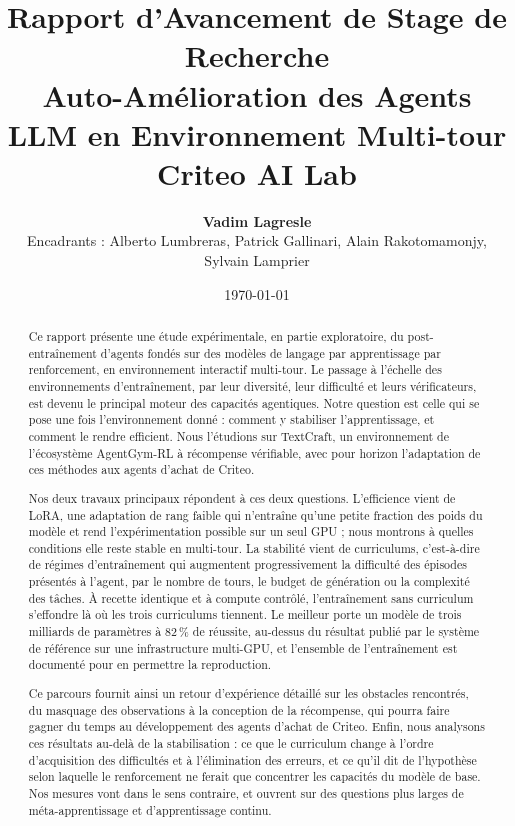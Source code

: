 \documentclass[11pt,a4paper]{article}
\title{\Large \textbf{Rapport d'Avancement de Stage de Recherche}\\ \huge \textbf{Auto-Amélioration des Agents LLM en Environnement Multi-tour}\\ \large Criteo AI Lab}
\author{\textbf{Vadim Lagresle} \\ Encadrants : Alberto Lumbreras, Patrick Gallinari, Alain Rakotomamonjy, Sylvain Lamprier}
\date{\today}
\begin{document}
\maketitle

\vspace{2cm}



\begin{abstract}
\noindent Ce rapport présente une étude expérimentale, en partie exploratoire, du post-entraînement d'agents fondés sur des modèles de langage par apprentissage par renforcement, en environnement interactif multi-tour. Le passage à l'échelle des environnements d'entraînement, par leur diversité, leur difficulté et leurs vérificateurs, est devenu le principal moteur des capacités agentiques. Notre question est celle qui se pose une fois l'environnement donné : comment y stabiliser l'apprentissage, et comment le rendre efficient. Nous l'étudions sur TextCraft, un environnement de l'écosystème AgentGym-RL à récompense vérifiable, avec pour horizon l'adaptation de ces méthodes aux agents d'achat de Criteo.

Nos deux travaux principaux répondent à ces deux questions. L'efficience vient de LoRA, une adaptation de rang faible qui n'entraîne qu'une petite fraction des poids du modèle et rend l'expérimentation possible sur un seul GPU ; nous montrons à quelles conditions elle reste stable en multi-tour. La stabilité vient de curriculums, c'est-à-dire de régimes d'entraînement qui augmentent progressivement la difficulté des épisodes présentés à l'agent, par le nombre de tours, le budget de génération ou la complexité des tâches. À recette identique et à compute contrôlé, l'entraînement sans curriculum s'effondre là où les trois curriculums tiennent. Le meilleur porte un modèle de trois milliards de paramètres à 82\,\% de réussite, au-dessus du résultat publié par le système de référence sur une infrastructure multi-GPU, et l'ensemble de l'entraînement est documenté pour en permettre la reproduction.

Ce parcours fournit ainsi un retour d'expérience détaillé sur les obstacles rencontrés, du masquage des observations à la conception de la récompense, qui pourra faire gagner du temps au développement des agents d'achat de Criteo. Enfin, nous analysons ces résultats au-delà de la stabilisation : ce que le curriculum change à l'ordre d'acquisition des difficultés et à l'élimination des erreurs, et ce qu'il dit de l'hypothèse selon laquelle le renforcement ne ferait que concentrer les capacités du modèle de base. Nos mesures vont dans le sens contraire, et ouvrent sur des questions plus larges de méta-apprentissage et d'apprentissage continu.
\end{abstract}
\end{document}
